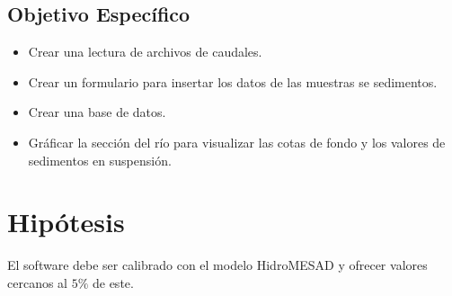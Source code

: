 \documentclass[a4paper,openright,12pt]{report}
\begin{document}
	\subsection{Objetivo Espec\'ifico}
	\begin{itemize}
	\item Crear una lectura de archivos de caudales.
	\item Crear un formulario para insertar los datos de las muestras se sedimentos.
	\item Crear una base de datos.
	\item Gr\'aficar la sección del r\'io para visualizar las cotas de fondo y los valores de sedimentos en suspensi\'on.
	\end{itemize}

\section{Hip\'otesis}
	El software debe ser calibrado con el modelo HidroMESAD y ofrecer valores cercanos al $5\%$ de este.
\end{document}
